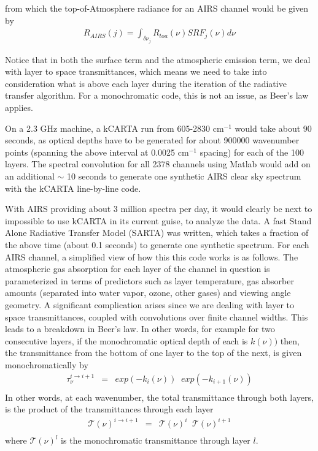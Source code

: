 \documentclass[11pt]{article}
\newcommand{\kc}{\textsf{kCARTA}\xspace}
\newcommand{\wn}{cm$^{-1}$\xspace}
\begin{document}
from which the top-of-Atmosphere radiance for an AIRS channel would be given by
\begin{eqnarray*}
  R_{AIRS}(j) = \int_{\delta \nu_{j}} R_{toa}(\nu) SRF_{j}(\nu) d\nu
\end{eqnarray*}

Notice that in both the surface term and the atmospheric emission term, we deal with layer to space transmittances, 
which means we need to take into consideration what is above each layer during the iteration of the radiative transfer
algorithm. For a monochromatic code, this is not an issue, as Beer's law applies.

On a 2.3 GHz machine, a \kc run from 605-2830 \wn would take about 90 seconds, as optical depths have to be 
generated for about 900000 wavenumber points (spanning the above interval at 0.0025 \wn spacing) for each of the
100 layers. The spectral convolution for all 2378 channels using Matlab would add on an additional $\sim$ 
10 seconds to generate one synthetic AIRS clear sky spectrum with the \kc line-by-line code.

With AIRS providing about 3 million spectra per day, it would clearly be next to impossible to use \kc in its
current guise, to analyze the data. A fast Stand Alone Radiative Transfer Model (SARTA) was written, which 
takes a fraction of the above time (about 0.1 seconds) to generate one synthetic spectrum. For each AIRS
channel, a simplified view of how this this code works is as follows. The atmospheric gas absorption for  
each layer of the channel in question is parameterized in terms of predictors such as layer temperature, 
gas absorber amounts (separated into water vapor, ozone, other gases) and viewing angle geometry. A significant
complication arises since we are dealing with layer to space transmittances, coupled with convolutions over
finite channel widths. This leads to a breakdown in Beer's law. In other words, for example for two 
consecutive layers, if the monochromatic optical depth of each is $k(\nu))$ then, the transmittance from the 
bottom of one layer to the top of the next, is given monochromatically by
\begin{eqnarray*}
  \tau_{\nu}^{i \rightarrow i+1} & = & exp(-k_{i}(\nu)) \;\; exp(-k_{i+1}(\nu)) \\
\end{eqnarray*}
In other words, at each wavenumber, the total transmittance through both layers, is the product of the 
transmittances through each layer
\begin{eqnarray*}
  \mathcal{T}(\nu)^{i \rightarrow i+1}           & = &  \mathcal{T}(\nu)^{i} \;\;  \mathcal{T}(\nu)^{i+1}\\
\end{eqnarray*}
where $\mathcal{T}(\nu)^{l}$ is the monochromatic transmittance through layer $l$. 
\end{document}
